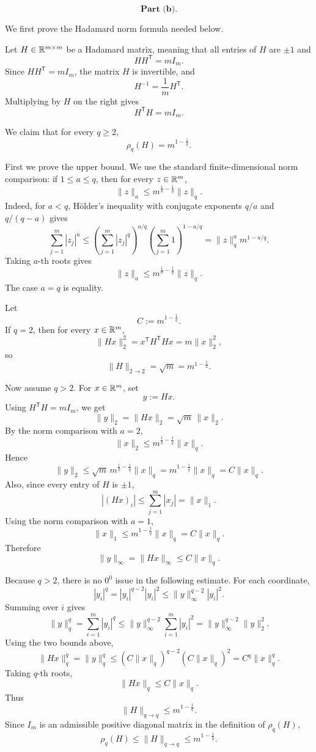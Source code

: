 \[
\textbf{Part (b).}
\]

We first prove the Hadamard norm formula needed below.

Let \(H\in \mathbb{R}^{m\times m}\) be a Hadamard matrix, meaning that all entries of \(H\) are \(\pm 1\) and
\[
HH^{\mathsf T}=mI_m.
\]
Since \(HH^{\mathsf T}=mI_m\), the matrix \(H\) is invertible, and
\[
H^{-1}=\frac{1}{m}H^{\mathsf T}.
\]
Multiplying by \(H\) on the right gives
\[
H^{\mathsf T}H=mI_m.
\]

We claim that for every \(q\geq 2\),
\[
\rho_q(H)=m^{1-\frac1q}.
\]

First we prove the upper bound. We use the standard finite-dimensional norm comparison: if \(1\leq a\leq q\), then for every \(z\in \mathbb{R}^m\),
\[
\|z\|_a\leq m^{\frac1a-\frac1q}\|z\|_q.
\]
Indeed, for \(a<q\), Hölder's inequality with conjugate exponents \(q/a\) and \(q/(q-a)\) gives
\[
\sum_{j=1}^m |z_j|^a
\leq
\left(\sum_{j=1}^m |z_j|^q\right)^{a/q}
\left(\sum_{j=1}^m 1\right)^{1-a/q}
=
\|z\|_q^a m^{1-a/q}.
\]
Taking \(a\)-th roots gives
\[
\|z\|_a\leq m^{\frac1a-\frac1q}\|z\|_q.
\]
The case \(a=q\) is equality.

Let
\[
C:=m^{1-\frac1q}.
\]
If \(q=2\), then for every \(x\in \mathbb{R}^m\),
\[
\|Hx\|_2^2
=
x^{\mathsf T}H^{\mathsf T}Hx
=
m\|x\|_2^2,
\]
so
\[
\|H\|_{2\to 2}=\sqrt m=m^{1-\frac12}.
\]

Now assume \(q>2\). For \(x\in \mathbb{R}^m\), set
\[
y:=Hx.
\]
Using \(H^{\mathsf T}H=mI_m\), we get
\[
\|y\|_2=\|Hx\|_2=\sqrt m\,\|x\|_2.
\]
By the norm comparison with \(a=2\),
\[
\|x\|_2\leq m^{\frac12-\frac1q}\|x\|_q.
\]
Hence
\[
\|y\|_2\leq \sqrt m\,m^{\frac12-\frac1q}\|x\|_q
=
m^{1-\frac1q}\|x\|_q
=
C\|x\|_q.
\]
Also, since every entry of \(H\) is \(\pm 1\),
\[
|(Hx)_i|
\leq
\sum_{j=1}^m |x_j|
=
\|x\|_1.
\]
Using the norm comparison with \(a=1\),
\[
\|x\|_1\leq m^{1-\frac1q}\|x\|_q
=
C\|x\|_q.
\]
Therefore
\[
\|y\|_\infty=\|Hx\|_\infty\leq C\|x\|_q.
\]

Because \(q>2\), there is no \(0^0\) issue in the following estimate. For each coordinate,
\[
|y_i|^q=|y_i|^{q-2}|y_i|^2
\leq
\|y\|_\infty^{q-2}|y_i|^2.
\]
Summing over \(i\) gives
\[
\|y\|_q^q
=
\sum_{i=1}^m |y_i|^q
\leq
\|y\|_\infty^{q-2}\sum_{i=1}^m |y_i|^2
=
\|y\|_\infty^{q-2}\|y\|_2^2.
\]
Using the two bounds above,
\[
\|Hx\|_q^q
=
\|y\|_q^q
\leq
(C\|x\|_q)^{q-2}(C\|x\|_q)^2
=
C^q\|x\|_q^q.
\]
Taking \(q\)-th roots,
\[
\|Hx\|_q\leq C\|x\|_q.
\]
Thus
\[
\|H\|_{q\to q}\leq m^{1-\frac1q}.
\]
Since \(I_m\) is an admissible positive diagonal matrix in the definition of \(\rho_q(H)\),
\[
\rho_q(H)\leq \|H\|_{q\to q}\leq m^{1-\frac1q}.
\]

